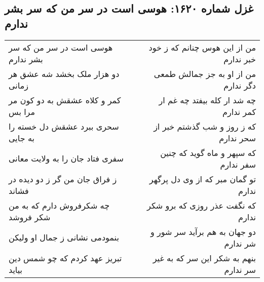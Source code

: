 \begin{center}
\section*{غزل شماره ۱۶۲۰: هوسی است در سر من که سر بشر ندارم}
\label{sec:1620}
\begin{longtable}{l p{0.5cm} r}
هوسی است در سر من که سر بشر ندارم
&&
من از این هوس چنانم که ز خود خبر ندارم
\\
دو هزار ملک بخشد شه عشق هر زمانی
&&
من از او به جز جمالش طمعی دگر ندارم
\\
کمر و کلاه عشقش به دو کون مر مرا بس
&&
چه شد ار کله بیفتد چه غم ار کمر ندارم
\\
سحری ببرد عشقش دل خسته را به جایی
&&
که ز روز و شب گذشتم خبر از سحر ندارم
\\
سفری فتاد جان را به ولایت معانی
&&
که سپهر و ماه گوید که چنین سفر ندارم
\\
ز فراق جان من گر ز دو دیده در فشاند
&&
تو گمان مبر که از وی دل پرگهر ندارم
\\
چه شکرفروش دارم که به من شکر فروشد
&&
که نگفت عذر روزی که برو شکر ندارم
\\
بنمودمی نشانی ز جمال او ولیکن
&&
دو جهان به هم برآید سر شور و شر ندارم
\\
تبریز عهد کردم که چو شمس دین بیاید
&&
بنهم به شکر این سر که به غیر سر ندارم
\\
\end{longtable}
\end{center}
